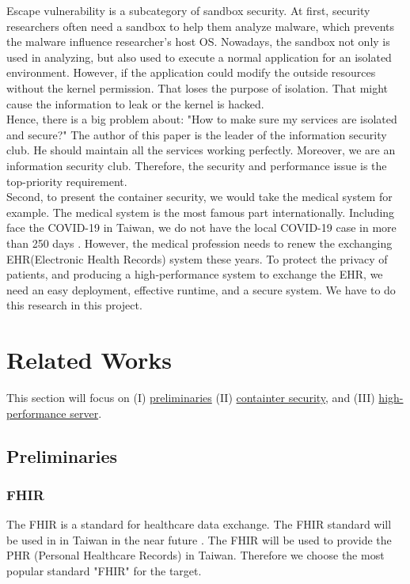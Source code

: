 \documentclass[12pt,a4paper]{article}
\begin{document}
Escape vulnerability is a subcategory of sandbox security. At first, security researchers often
need a sandbox to help them analyze malware, which prevents the malware influence researcher's
host OS. Nowadays, the sandbox not only is used in analyzing, but also used to execute a
normal application for an isolated environment. However, if the application could modify the
outside resources without the kernel permission. That loses the purpose of isolation. That
might cause the information to leak or the kernel is hacked.\\

Hence, there is a big problem about: "How to make sure my services are isolated and secure?" The
author of this paper is the leader of the information security club. He should maintain all
the services working perfectly. Moreover, we are an information security club. Therefore,
the security and performance issue is the top-priority requirement.\\

Second, to present the container security, we would take the medical system for
example.
The medical system is the most famous part internationally. Including face the COVID-19
in Taiwan, we do not have the local COVID-19 case in more than 250 days \cite{COVID19_CNN}.
However, the medical profession needs to renew the exchanging EHR(Electronic Health Records)
system these years. To protect the privacy of patients, and producing a high-performance
system to exchange the EHR, we need an easy deployment, effective runtime, and a secure system.
We have to do this research in this project.


\section{Related Works}
This section will focus on (\RN{1}) \hyperlink{preliminaries}{preliminaries} (\RN{2}) \hyperlink{security}{containter security}, and (\RN{3})
\hyperlink{heigh_performance}{high-performance server}.

\subsection{Preliminaries}
\hypertarget{preliminaries}{}
\subsubsection{FHIR}
The FHIR is a standard for healthcare data exchange. The FHIR standard will be used in
in Taiwan in the near future \cite{MOHW_FHIR}. The FHIR will be used to provide the PHR
(Personal Healthcare Records) in Taiwan. Therefore we choose the most popular standard
"FHIR" for the target.
\end{document}
